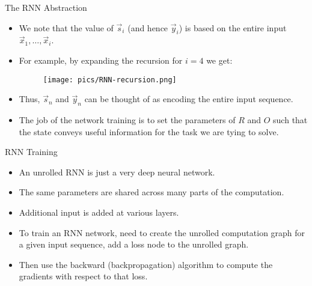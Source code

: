 \documentclass[handout]{beamer}
\begin{document}
\begin{frame}{The RNN Abstraction}
\begin{scriptsize}
\begin{itemize}
\item We note that the value of $\vec{s}_i$  (and hence $\vec{y}_i$) is based on the entire input $\vec{x}_1,\dots, \vec{x}_i$.
\item For example, by expanding the recursion for $i = 4$ we get:
  \begin{figure}[h]
        	\texttt{[image: pics/RNN-recursion.png]}
        \end{figure}
\item Thus, $\vec{s}_n$ and $\vec{y}_n$ can be thought of as encoding the entire input sequence.
\item The job of the network training is to set the parameters of $R$ and $O$ such that the state conveys useful information for the task we are tying to solve.

\end{itemize}
\end{scriptsize}
\end{frame}



\begin{frame}{RNN Training}
\begin{scriptsize}
\begin{itemize}
\item An unrolled RNN is just a very deep neural network.
\item The same parameters are shared across many parts of the computation.
\item Additional input is added at various layers.
\item To train an RNN network, need to create the unrolled computation graph for a given input sequence, add a loss node to the unrolled graph.
\item Then use the backward (backpropagation) algorithm to compute the gradients with respect to that loss.
\end{itemize}
\end{scriptsize}
\end{frame}
\end{document}
